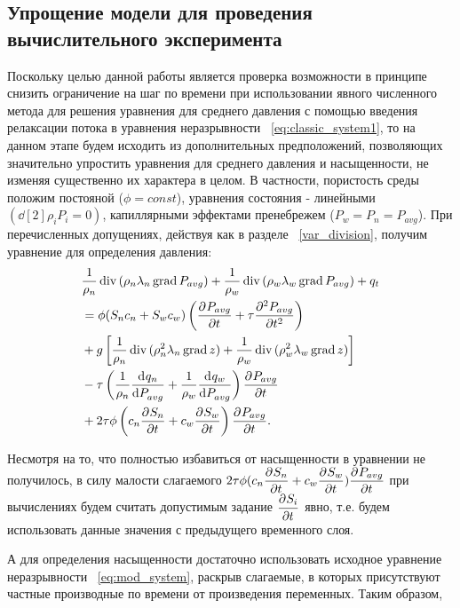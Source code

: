 \subsection{Упрощение модели для проведения вычислительного эксперимента}
\label{model_simplification}

Поскольку целью данной работы является проверка возможности в принципе снизить ограничение на шаг по времени при
использовании явного численного метода для решения уравнения для среднего давления
с помощью введения релаксации потока в уравнения неразрывности ~\eqref{eq:classic_system1}, то на данном этапе
будем исходить из дополнительных предположений, позволяющих значительно упростить уравнения для среднего давления
и насыщенности, не изменяя существенно их характера в целом. В частности, пористость среды положим постояной ($\phi = const$),
уравнения состояния - линейными $\left( \dd[2]{\rho_i}{P_i} = 0 \right)$, капиллярными эффектами пренебрежем ($P_w = P_n = P_{avg}$).
При перечисленных допущениях, действуя как в разделе ~\ref{var_division}, получим уравнение для определения давления:
\begin{equation} \label{eq:mod_pressure}
 \begin{aligned}
  &\frac{1}{\rho_n} \diver{ (\rho_n\lambda_n\grad{ P_{avg}})} + \frac{1}{\rho_w} \diver{ (\rho_w\lambda_w\grad{ P_{avg}})} + q_t \\
  & = \phi (S_n c_n + S_w c_w) \left( \pd{P_{avg}}{t} + \tau \pd[2]{P_{avg}}{t} \right) \\
  & + g \left[ \frac{1}{\rho_n} \diver{ (\rho_n^2\lambda_n\grad{ z})} + \frac{1}{\rho_w} \diver{ (\rho_w^2\lambda_w\grad{ z})} \right]  \\
  & -  \tau \left(\frac{1}{\rho_n}\dd{q_n}{P_{avg}} + \frac{1}{\rho_w}\dd{q_w}{P_{avg}}\right) \pd{P_{avg}}{t} \\
  & + 2 \tau \phi \left(c_n \pd{S_n}{t} + c_w\pd{S_w}{t}\right) \pd{P_{avg}}{t}.
 \end{aligned}
\end{equation}

Несмотря на то, что полностью избавиться от насыщенности в уравнении не получилось, в силу малости слагаемого
$2 \tau \phi (c_n \pd{S_n}{t} + c_w\pd{S_w}{t}) \pd{P_{avg}}{t}$
при вычислениях будем считать допустимым задание $\pd{S_i}{t}$ явно, т.е. будем использовать данные
значения с предыдущего временного слоя.

А для определения насыщенности достаточно использовать исходное уравнение неразрывности ~\eqref{eq:mod_system},
раскрыв слагаемые, в которых присутствуют частные производные по времени от произведения переменных. Таким образом,


